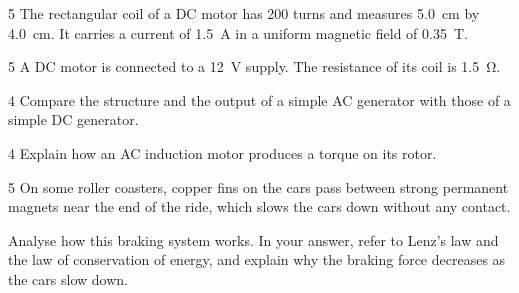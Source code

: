 \documentclass[12pt]{article}
\begin{document}

\begin{saq}{5}
The rectangular coil of a DC motor has 200 turns and measures \qty{5.0}{cm} by \qty{4.0}{cm}. It carries
a current of \qty{1.5}{A} in a uniform magnetic field of \qty{0.35}{T}.
\end{saq}

\begin{saq}{5}
A DC motor is connected to a \qty{12}{V} supply. The resistance of its coil is \qty{1.5}{\ohm}.
\end{saq}

\Needspace{110mm}
\begin{saq}{4}
Compare the structure and the output of a simple AC generator with those of a simple DC generator.
\end{saq}

\Needspace{110mm}
\begin{saq}{4}
Explain how an AC induction motor produces a torque on its rotor.
\end{saq}

\begin{saq}{5}
On some roller coasters, copper fins on the cars pass between strong permanent magnets near the end of
the ride, which slows the cars down without any contact.

Analyse how this braking system works. In your answer, refer to Lenz's law and the law of conservation
of energy, and explain why the braking force decreases as the cars slow down.
\end{saq}
\end{document}
